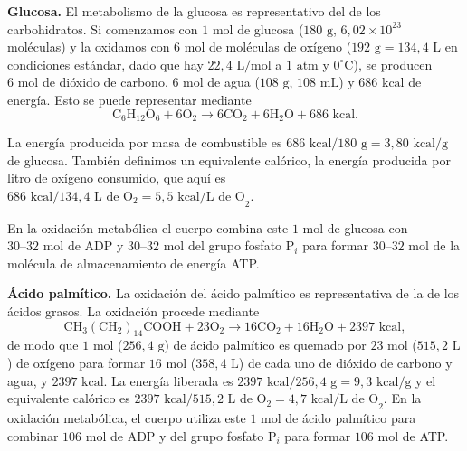 \documentclass[12pt]{book}
\begin{document}
\textbf{Glucosa.} El metabolismo de la glucosa es representativo del de los carbohidratos. Si comenzamos con $1\text{ mol}$ de glucosa ($180\text{ g}$, $6,02 \times 10^{23}$ moléculas) y la oxidamos con $6\text{ mol}$ de moléculas de oxígeno ($192\text{ g} = 134,4\text{ L}$ en condiciones estándar, dado que hay $22,4\text{ L/mol}$ a $1\text{ atm}$ y $0^\circ\text{C}$), se producen $6\text{ mol}$ de dióxido de carbono, $6\text{ mol}$ de agua ($108\text{ g}$, $108\text{ mL}$) y $686\text{ kcal}$ de energía. Esto se puede representar mediante
\begin{equation}
\text{C}_6\text{H}_{12}\text{O}_6 + 6\text{O}_2 \rightarrow 6\text{CO}_2 + 6\text{H}_2\text{O} + 686\text{ kcal}.
\label{eq:68}
\end{equation}

La energía producida por masa de combustible es $686\text{ kcal}/180\text{ g} = 3,80\text{ kcal/g}$ de glucosa. También definimos un equivalente calórico, la energía producida por litro de oxígeno consumido, que aquí es $686\text{ kcal}/134,4\text{ L de O}_2 = 5,5\text{ kcal/L de O}_2$.

En la oxidación metabólica el cuerpo combina este $1\text{ mol}$ de glucosa con $30\text{--}32\text{ mol}$ de ADP y $30\text{--}32\text{ mol}$ del grupo fosfato $\text{P}_i$ para formar $30\text{--}32\text{ mol}$ de la molécula de almacenamiento de energía ATP.

\textbf{Ácido palmítico.} La oxidación del ácido palmítico es representativa de la de los ácidos grasos. La oxidación procede mediante
\begin{equation}
\text{CH}_3(\text{CH}_2)_{14}\text{COOH} + 23\text{O}_2 \rightarrow 16\text{CO}_2 + 16\text{H}_2\text{O} + 2397\text{ kcal},
\label{eq:69}
\end{equation}
de modo que $1\text{ mol}$ ($256,4\text{ g}$) de ácido palmítico es quemado por $23\text{ mol}$ ($515,2\text{ L}$) de oxígeno para formar $16\text{ mol}$ ($358,4\text{ L}$) de cada uno de dióxido de carbono y agua, y $2397\text{ kcal}$. La energía liberada es $2397\text{ kcal}/256,4\text{ g} = 9,3\text{ kcal/g}$ y el equivalente calórico es $2397\text{ kcal}/515,2\text{ L de O}_2 = 4,7\text{ kcal/L de O}_2$. En la oxidación metabólica, el cuerpo utiliza este $1\text{ mol}$ de ácido palmítico para combinar $106\text{ mol}$ de ADP y del grupo fosfato $\text{P}_i$ para formar $106\text{ mol}$ de ATP.
\end{document}
